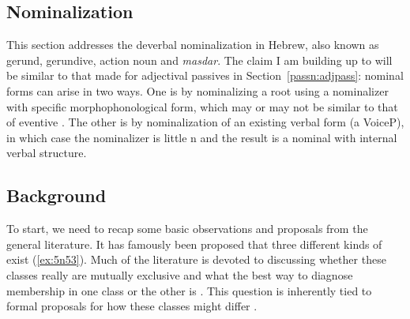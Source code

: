 \begin{exe}
\begin{xlist}
\begin{exe}
\begin{xlist}
\begin{exe}
\begin{exe}
\begin{xlist}
\begin{exe}
\begin{exe}
\begin{xlist}
\begin{exe}
\begin{xlist}
\begin{exe}
\begin{xlist}
\begin{exe}
\begin{xlist}
\begin{xlist}
\begin{exe}
\begin{xlist}
\begin{exe}
\begin{xlist}
\begin{exe}
\begin{exe}
\begin{exe}
\begin{xlist}
\begin{exe}
\begin{exe}
\begin{xlist}
\begin{exe}
\begin{xlist}
\begin{exe}
\begin{xlist}
\begin{exe}
\begin{xlist}
\begin{xlist}
\begin{exe}
\begin{xlist}
\begin{exe}
\begin{xlist}
\begin{exe}
\begin{xlist}
\begin{exe}
\begin{xlist}
\begin{exe}
\begin{exe}
\begin{exe}
\begin{exe}
\begin{exe}
\begin{xlist}
\begin{xlist}
\begin{exe}
\begin{xlist}
\begin{exe}
\begin{xlist}
\begin{exe}
\begin{exe}
\begin{exe}
\begin{xlist}
\begin{exe}
\begin{xlist}
\begin{exe}
\begin{xlist}
\begin{exe}
\section{Nominalization} \label{passn:n}
This section addresses the deverbal nominalization in Hebrew, also known as gerund, gerundive, action noun and \emph{masdar}. The claim I am building up to will be similar to that made for adjectival passives in Section~\ref{passn:adjpass}: nominal forms can arise in two ways. One is by nominalizing a root using a nominalizer with specific morphophonological form, which may or may not be similar to that of eventive . The other is by nominalization of an existing verbal form (a VoiceP), in which case the nominalizer is little n and the result is a nominal with internal verbal structure.

	\subsection{Background}
To start, we need to recap some basic observations and proposals from the general literature. It has famously been proposed \citep{grimshaw90} that three different kinds of \textsc{} exist (\ref{ex:5n53}). Much of the literature is devoted to discussing whether these classes really are mutually exclusive and what the best way to diagnose membership in one class or the other is \citep{alexiadou01,alexiadou09,alexiadou10b,alexiadou17,borer13oup,borer14lingua}. This question is inherently tied to formal proposals for how these classes might differ \citep{chomsky70,marantz97,harley09n,bruening13,wood19lsa}.


\end{exe}
\end{xlist}
\end{exe}
\end{xlist}
\end{exe}
\end{xlist}
\end{exe}
\end{exe}
\end{exe}
\end{xlist}
\end{exe}
\end{xlist}
\end{exe}
\end{xlist}
\end{xlist}
\end{exe}
\end{exe}
\end{exe}
\end{exe}
\end{exe}
\end{xlist}
\end{exe}
\end{xlist}
\end{exe}
\end{xlist}
\end{exe}
\end{xlist}
\end{exe}
\end{xlist}
\end{xlist}
\end{exe}
\end{xlist}
\end{exe}
\end{xlist}
\end{exe}
\end{xlist}
\end{exe}
\end{exe}
\end{xlist}
\end{exe}
\end{exe}
\end{exe}
\end{xlist}
\end{exe}
\end{xlist}
\end{exe}
\end{xlist}
\end{xlist}
\end{exe}
\end{xlist}
\end{exe}
\end{xlist}
\end{exe}
\end{xlist}
\end{exe}
\end{exe}
\end{xlist}
\end{exe}
\end{exe}
\end{xlist}
\end{exe}
\end{xlist}
\end{exe}
